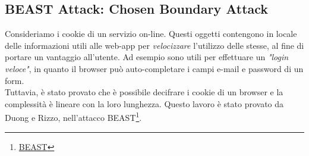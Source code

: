 \subsection{BEAST Attack: Chosen Boundary Attack}
Consideriamo i cookie di un servizio on-line. Questi oggetti contengono in locale delle informazioni utili alle web-app per \textit{velocizzare} l'utilizzo delle stesse, al fine di portare un vantaggio all'utente. Ad esempio sono utili per effettuare un \textit{"login veloce"}, in quanto il browser può auto-completare i campi e-mail e password di un form.\\
Tuttavia, è stato provato che è possibile decifrare i cookie di un browser e la complessità è lineare con la loro lunghezza. Questo lavoro è stato provato da Duong e Rizzo, nell'attacco BEAST\footnote{\href{https://bug665814.bmoattachments.org/attachment.cgi?id=540839}{BEAST}}.

